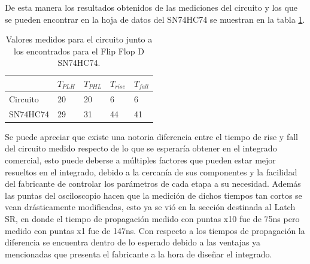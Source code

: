 De esta manera los resultados obtenidos de las mediciones del circuito y los que se pueden encontrar en la hoja de datos del SN74HC74 se muestran en la tabla \ref{ej6_tabla_flip_flop_mediciones}.
%
\begin{table}[H]
\caption{Valores medidos para el circuito junto a los encontrados para el Flip Flop D SN74HC74.}
\label{ej6_tabla_flip_flop_mediciones}
\centering
\begin{tabular}{|l||l|l|l|l|}
\hline
    & $T_{PLH}$ & $T_{PHL}$ & $T_{rise}$ & $T_{fall}$ \\ \hline \hline
Circuito & 20        & 20        & 6          & 6          \\ \hline
SN74HC74 & 29        & 31        & 44         & 41         \\ \hline
\end{tabular}
\end{table}
%
\noindent
Se puede apreciar que existe una notoria diferencia entre el tiempo de rise y fall del circuito medido respecto de lo que se esperaría obtener en el integrado comercial, esto puede deberse a múltiples factores que pueden estar mejor resueltos en el integrado, debido a la cercanía de sus componentes y la facilidad del fabricante de controlar los parámetros de cada etapa a su necesidad. Además las puntas del osciloscopio hacen que la medición de dichos tiempos tan cortos se vean drásticamente modificadas, esto ya se vió en la sección destinada al Latch SR, en donde el tiempo de propagación medido con puntas x10 fue de 75ns pero medido con puntas x1 fue de 147ns.   
Con respecto a los tiempos de propagaci\'on la diferencia se encuentra dentro de lo esperado debido a las ventajas ya mencionadas que presenta el fabricante a la hora de diseñar el integrado.